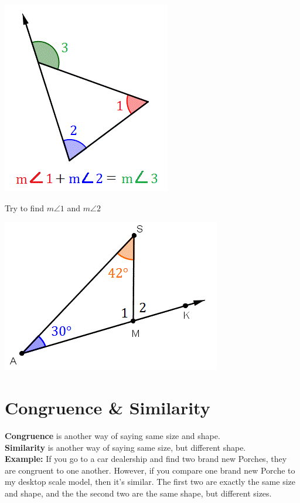 \documentclass[12pt]{article}
\begin{document}
\begin{center}
\includegraphics[scale=.6]{triangle8.png}\\
\end{center}

Try to find $m\angle 1$ and $m\angle 2$\\

\begin{center}
\includegraphics[scale=.5]{triangle9.png}
\end{center}


\section*{Congruence \& Similarity}

\textbf{Congruence} is another way of saying same size and shape.\\

\textbf{Similarity} is another way of saying same size, but different shape.\\

\textbf{Example:} If you go to a car dealership and find two brand new Porches, they are congruent to one another. However, if you compare one brand new Porche to my desktop scale model, then it's similar. The first two are exactly the same size and shape, and the the second two are the same shape, but different sizes.\\
\end{document}
